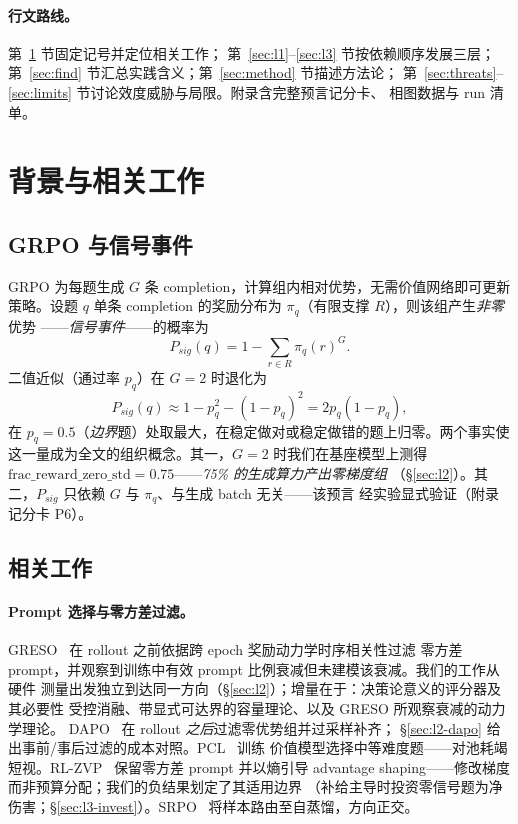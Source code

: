 \documentclass[11pt]{article}
\theoremstyle{definition}
\begin{document}
\paragraph{行文路线。}第~\ref{sec:bg} 节固定记号并定位相关工作；
第~\ref{sec:l1}--\ref{sec:l3} 节按依赖顺序发展三层；
第~\ref{sec:find} 节汇总实践含义；第~\ref{sec:method} 节描述方法论；
第~\ref{sec:threats}--\ref{sec:limits} 节讨论效度威胁与局限。附录含完整预言记分卡、
相图数据与 run 清单。

\section{背景与相关工作}\label{sec:bg}

\subsection{GRPO 与信号事件}\label{sec:bg-grpo}
GRPO 为每题生成 $G$ 条 completion，计算组内相对优势，无需价值网络即可更新策略。设题
$q$ 单条 completion 的奖励分布为 $\pi_q$（有限支撑 $R$），则该组产生\emph{非零}优势
——\emph{信号事件}——的概率为
\begin{equation}\label{eq:psig-exact}
P_{sig}(q) = 1 - \sum_{r \in R} \pi_q(r)^{G}.
\end{equation}
二值近似（通过率 $p_q$）在 $G{=}2$ 时退化为
\begin{equation}\label{eq:psig-binary}
P_{sig}(q) \approx 1 - p_q^{2} - (1-p_q)^{2} = 2p_q(1-p_q),
\end{equation}
在 $p_q{=}0.5$（\emph{边界}题）处取最大，在稳定做对或稳定做错的题上归零。两个事实使
这一量成为全文的组织概念。其一，$G{=}2$ 时我们在基座模型上测得
$\text{frac\_reward\_zero\_std}{=}0.75$——\emph{75\% 的生成算力产出零梯度组}
（\S\ref{sec:l2}）。其二，$P_{sig}$ 只依赖 $G$ 与 $\pi_q$、与生成 batch 无关——该预言
经实验显式验证（附录记分卡 P6）。

\subsection{相关工作}\label{sec:bg-related}
\paragraph{Prompt 选择与零方差过滤。}
GRESO~\citep{zheng2025greso} 在 rollout 之前依据跨 epoch 奖励动力学时序相关性过滤
零方差 prompt，并观察到训练中有效 prompt 比例衰减但未建模该衰减。我们的工作从硬件
测量出发独立到达同一方向（\S\ref{sec:l2}）；增量在于：决策论意义的评分器及其必要性
受控消融、带显式可达界的容量理论、以及 GRESO 所观察衰减的动力学理论。
DAPO~\citep{yu2025dapo} 在 rollout \emph{之后}过滤零优势组并过采样补齐；
\S\ref{sec:l2-dapo} 给出事前/事后过滤的成本对照。PCL~\citep{gao2025pcl} 训练
价值模型选择中等难度题——对池耗竭短视。RL-ZVP~\citep{le2025rlzvp} 保留零方差 prompt
并以熵引导 advantage shaping——修改梯度而非预算分配；我们的负结果划定了其适用边界
（补给主导时投资零信号题为净伤害；\S\ref{sec:l3-invest}）。SRPO~\citep{li2026srpo}
将样本路由至自蒸馏，方向正交。
\end{document}
